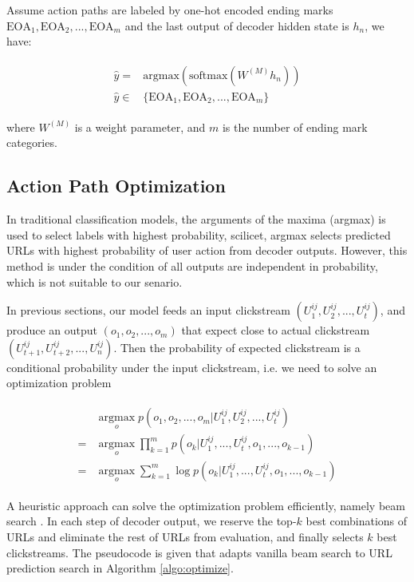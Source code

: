 Assume action paths are labeled by one-hot encoded ending marks 
$\text{EOA}_1, \text{EOA}_2, ..., \text{EOA}_m$ and the last output
of decoder hidden state is $h_n$, we have:

\begin{align}
\label{eqn:lstm}
\begin{split}
    \hat{y} =& \text{argmax} (\text{softmax} (W^{(M)} h_n)) \\
    \hat{y} \in& \{ \text{EOA}_1, \text{EOA}_2, ..., \text{EOA}_m \}
\end{split}
\end{align}

where $W^{(M)}$ is a weight parameter, and $m$ is the number of ending mark categories.

\subsection{Action Path Optimization}

In traditional classification models, the arguments of the maxima (argmax) is used to select
labels with highest probability, scilicet, argmax selects predicted URLs with highest probability
of user action from decoder outputs. However, this method is under the condition of all outputs
are independent in probability, which is not suitable to our senario.

In previous sections, our model feeds an input clickstream $(U^{ij}_1, U^{ij}_2, ..., U^{ij}_t)$,
and produce an output $(o_1, o_2, ..., o_{m})$ that expect close to actual clickstream $(U^{ij}_{t+1}, U^{ij}_{t+2}, ..., U^{ij}_n)$.
Then the probability of expected clickstream is 
a conditional probability under the input clickstream, i.e. we need to solve an optimization problem

\begin{align}
\label{eqn:lstm}
\begin{split}
    & \operatorname*{argmax}_{o} p( o_1, o_2, ..., o_{m} | U^{ij}_1, U^{ij}_2, ..., U^{ij}_t ) \\
   =& \operatorname*{argmax}_{o} \prod_{k=1}^{m} p(o_{k} | U^{ij}_1, ..., U^{ij}_t, o_1, ..., o_{k-1}) \\
   =& \operatorname*{argmax}_{o} \sum_{k=1}^{m} \log p(o_{k} | U^{ij}_1, ..., U^{ij}_t, o_1, ..., o_{k-1})
\end{split}
\end{align}

A heuristic approach can solve the optimization problem efficiently, 
namely beam search \cite{DBLP:journals/corr/abs-1211-3711}. 
In each step of decoder output, we reserve the top-$k$ best combinations of URLs and eliminate the rest of
URLs from evaluation, and finally selects $k$ best clickstreams.
The pseudocode is given that adapts vanilla beam search to URL prediction search in Algorithm \ref{algo:optimize}.

